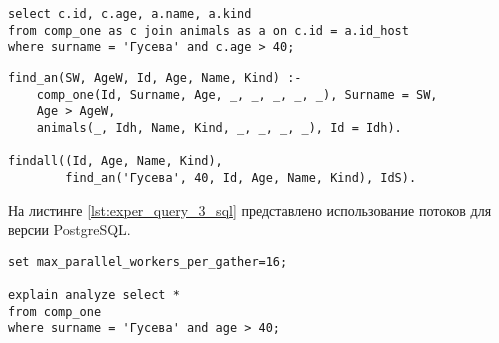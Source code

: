 \begin{lstlisting}[label=lst:exper_query_2_sql, caption=Запрос c оператором JOIN (PostgreSQL), basicstyle=\small, numbers = none]
select c.id, c.age, a.name, a.kind
from comp_one as c join animals as a on c.id = a.id_host 
where surname = 'Гусева' and c.age > 40;
\end{lstlisting}
\newpage

\begin{lstlisting}[label=lst:exper_query_2_prolog, caption=Запрос c оператором JOIN (SWI-Prolog), basicstyle=\small, numbers = none]
find_an(SW, AgeW, Id, Age, Name, Kind) :-
	comp_one(Id, Surname, Age, _, _, _, _, _), Surname = SW,
	Age > AgeW, 
	animals(_, Idh, Name, Kind, _, _, _, _), Id = Idh).
	
findall((Id, Age, Name, Kind), 
        find_an('Гусева', 40, Id, Age, Name, Kind), IdS).
\end{lstlisting}

На листинге \ref{lst:exper_query_3_sql} представлено использование потоков для версии \newline PostgreSQL.
\begin{lstlisting}[label=lst:exper_query_3_sql, caption=Запрос c оператором SELECT с использованием 5 потоков (PostgreSQL), basicstyle=\small, numbers = none]
set max_parallel_workers_per_gather=16;

explain analyze select *
from comp_one
where surname = 'Гусева' and age > 40;
\end{lstlisting}


